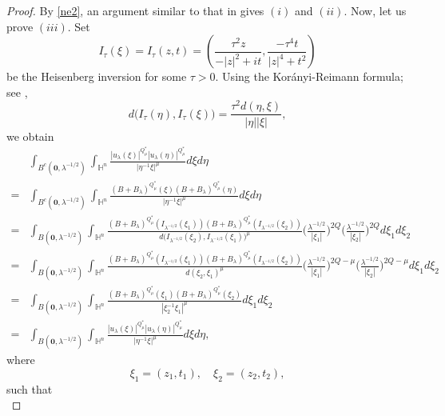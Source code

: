 \documentclass[10pt,a4paper]{amsart}
\begin{document}
\begin{proof}
By \eqref{ne2}, an argument similar to that in \cite[Proposition~3.1]{K25} gives $(i)$ and $(ii)$. Now, let us prove $(iii)$. Set
\begin{equation*}
 I_{\tau}(\xi)=I_{\tau}(z,t)=\left(\frac{\tau^2z}{-|z|^2+it},\frac{-\tau^4t}{|z|^4+t^2}\right)
\end{equation*}
be the Heisenberg inversion for some $\tau>0$. Using the Kor\'{a}nyi-Reimann formula; see \cite{P16},
\begin{equation*}
 d\big(I_{\tau}(\eta),I_{\tau}(\xi)\big)=\frac{\tau^2 d(\eta,\xi)}{|\eta||\xi|},
\end{equation*}
we obtain
\begin{align*}
 &\int_{B^c(\mathbf{0},\lambda^{-1/2})}\int_{\mathbb{H}^{n}}\frac{|u_\lambda(\xi)|^{Q^{\ast}_{\mu}}|u_\lambda(\eta)|
^{Q^{\ast}_{\mu}}}{|\eta^{-1}\xi|^{\mu}}{d}\xi{d}\eta\\
=&
\int_{B^c(\mathbf{0},\lambda^{-1/2})}\int_{\mathbb{H}^{n}}\frac{(B+B_\lambda)^{Q^{\ast}_{\mu}}(\xi)(B+B_\lambda)
^{Q^{\ast}_{\mu}}(\eta)}{|\eta^{-1}\xi|^{\mu}}{d}\xi{d}\eta\\
=&\int_{B(\mathbf{0},\lambda^{-1/2})}\int_{\mathbb{H}^{n}}\frac{(B+B_\lambda)^{Q^{\ast}_{\mu}}(I_{\lambda^{-1/2}}(\xi_1))(B+B_\lambda)
^{Q^{\ast}_{\mu}}(I_{\lambda^{-1/2}}(\xi_2))}{d\big(I_{\lambda^{-1/2}}(\xi_2),I_{\lambda^{-1/2}}(\xi_1)\big)^{\mu}}
\bigg(\frac{\lambda^{-1/2}}{|\xi_1|}\bigg)^{2Q}\bigg(\frac{\lambda^{-1/2}}{|\xi_2|}\bigg)^{2Q}{d}\xi_1{d}\xi_2\\
=&\int_{B(\mathbf{0},\lambda^{-1/2})}\int_{\mathbb{H}^{n}}\frac{(B+B_\lambda)^{Q^{\ast}_{\mu}}(I_{\lambda^{-1/2}}(\xi_1))(B+B_\lambda)
^{Q^{\ast}_{\mu}}(I_{\lambda^{-1/2}}(\xi_2))}{d(\xi_2,\xi_1)^{\mu}}
\bigg(\frac{\lambda^{-1/2}}{|\xi_1|}\bigg)^{2Q-\mu}\bigg(\frac{\lambda^{-1/2}}{|\xi_2|}\bigg)^{2Q-\mu}{d}\xi_1{d}\xi_2\\
=&\int_{B(\mathbf{0},\lambda^{-1/2})}\int_{\mathbb{H}^{n}}\frac{(B+B_\lambda)^{Q^{\ast}_{\mu}}(\xi_1)(B+B_\lambda)
^{Q^{\ast}_{\mu}}(\xi_2)}{|\xi_2^{-1}\xi_1|^{\mu}}{d}\xi_1{d}\xi_2\\
=&\int_{B(\mathbf{0},\lambda^{-1/2})}\int_{\mathbb{H}^{n}}\frac{|u_\lambda(\xi)|^{Q^{\ast}_{\mu}}|u_\lambda(\eta)|
^{Q^{\ast}_{\mu}}}{|\eta^{-1}\xi|^{\mu}}{d}\xi{d}\eta,
\end{align*}
where
\begin{equation*}
 \xi_1=(z_1,t_1),\quad \xi_2=(z_2,t_2),
\end{equation*}
such that
\begin{equation*}

\end{equation*}
\end{proof}
\end{document}
